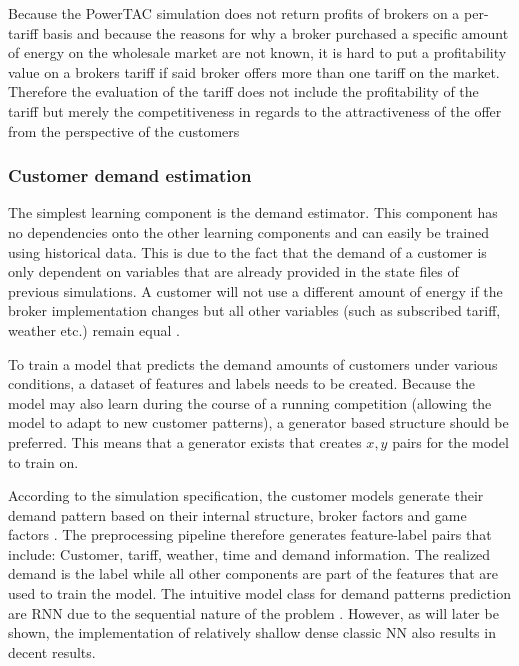 Because the \ac {PowerTAC} simulation does not return profits of brokers on a per-tariff basis and because the reasons
for why a broker purchased a specific amount of energy on the wholesale market are not known, it is hard to put a
profitability value on a brokers tariff if said broker offers more than one tariff on the market. Therefore the
evaluation of the tariff does not include the profitability of the tariff but merely the competitiveness in regards to
the attractiveness of the offer from the perspective of the customers
%
%
\subsubsection{Customer demand estimation}%
\label{ssub:customer_demand_estimation}

The simplest learning component is the demand estimator. This component has no dependencies onto the other learning components and can easily be trained using historical data. This is due to the fact that the demand of a customer is only dependent on variables that are already provided in the state files of previous simulations. A customer will not use a different amount of energy if the broker implementation changes but all other variables (such as subscribed tariff, weather etc.) remain equal .

To train a model that predicts the demand amounts of customers under various conditions, a dataset of features and labels needs to be created. Because the model may also learn during the course of a running competition (allowing the model to adapt to new customer patterns), a generator based structure should be preferred. This means that a generator exists that creates $x, y$ pairs for the model to train on.

According to the simulation specification, the customer models generate their demand pattern based on their internal structure, broker factors and game factors \citep[]{ketter2018powertac}. The preprocessing pipeline therefore generates feature-label pairs that include: Customer, tariff, weather, time and demand information. The realized demand is the label while all other components are part of the features that are used to train the model. The intuitive model class for demand patterns prediction are \ac {RNN} due to the sequential nature of the problem \citep[]{EvalGRU2014}. However, as will later be shown, the implementation of relatively shallow dense classic \ac {NN} also results in decent results. 


